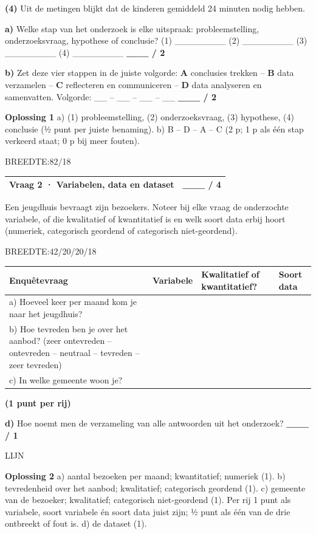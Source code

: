 \documentclass{article}
\newcommand{\lijn}{\par LIJN\par}
\newcommand{\breedtes}[1]{\par BREEDTE:#1\par}
\begin{document}
\textbf{(4)} Uit de metingen blijkt dat de kinderen gemiddeld 24 minuten nodig hebben.

\textbf{a)} Welke stap van het onderzoek is elke uitspraak: probleemstelling, onderzoeksvraag, hypothese of conclusie? (1) \_\_\_\_\_\_\_\_ (2) \_\_\_\_\_\_\_\_ (3) \_\_\_\_\_\_\_\_ (4) \_\_\_\_\_\_\_\_ \hfill \textbf{\_\_\_ / 2} 

\textbf{b)} Zet deze vier stappen in de juiste volgorde: \textbf{A} conclusies trekken – \textbf{B} data verzamelen – \textbf{C} reflecteren en communiceren – \textbf{D} data analyseren en samenvatten. Volgorde: \_\_ – \_\_ – \_\_ – \_\_ \hfill \textbf{\_\_\_ / 2} 

\begin{oplossing}
\textbf{Oplossing 1} \quad a) (1) probleemstelling, (2) onderzoeksvraag, (3) hypothese, (4) conclusie (½ punt per juiste benaming). b) B – D – A – C (2 p; 1 p als één stap verkeerd staat; 0 p bij meer fouten).
\end{oplossing}

\breedtes{82/18}
\begin{tabular}{lc}
\hline
Vraag 2 · Variabelen, data en dataset & \_\_\_ / 4 \\
\hline
\end{tabular}

Een jeugdhuis bevraagt zijn bezoekers. Noteer bij elke vraag de onderzochte variabele, of die kwalitatief of kwantitatief is en welk soort data erbij hoort (numeriek, categorisch geordend of categorisch niet-geordend).

\breedtes{42/20/20/18}
\begin{tabular}{llll}
\hline
Enquêtevraag & Variabele & Kwalitatief of kwantitatief? & Soort data \\
\hline
a) Hoeveel keer per maand kom je naar het jeugdhuis? & & & \\
b) Hoe tevreden ben je over het aanbod? (zeer ontevreden – ontevreden – neutraal – tevreden – zeer tevreden) & & & \\
c) In welke gemeente woon je? & & & \\
\hline
\end{tabular}

\textbf{(1 punt per rij)}

\textbf{d)} Hoe noemt men de verzameling van alle antwoorden uit het onderzoek? \hfill \textbf{\_\_\_ / 1} \lijn 

\begin{oplossing}
\textbf{Oplossing 2} \quad a) aantal bezoeken per maand; kwantitatief; numeriek (1). b) tevredenheid over het aanbod; kwalitatief; categorisch geordend (1). c) gemeente van de bezoeker; kwalitatief; categorisch niet-geordend (1). Per rij 1 punt als variabele, soort variabele én soort data juist zijn; ½ punt als één van de drie ontbreekt of fout is. d) de dataset (1).
\end{oplossing}
\end{document}
